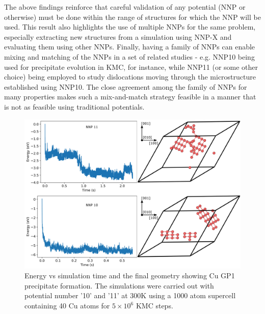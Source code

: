 \documentclass{article}
\begin{document}
The above findings reinforce that careful validation of any potential (NNP or otherwise) must be done within the range of structures for which the NNP will be used.  This result also highlights the use of multiple NNPs for the same problem, especially extracting new structures from a simulation using NNP-X and evaluating them using other NNPs.  Finally, having a family of NNPs can enable mixing and matching of the NNPs in a set of related studies - e.g. NNP10 being used for precipitate evolution in KMC, for instance, while NNP11 (or some other choice) being employed to study dislocations moving through the microstructure established using NNP10.  The close agreement among the family of NNPs for many properties makes such a mix-and-match strategy feasible in a manner that is not as feasible using traditional potentials.


\begin{figure}[H]
  \centering
  \includegraphics[width=6.5in]{kmcFigures/gp1.pdf}
  \caption{Energy vs simulation time and the final geometry showing Cu GP1 precipitate formation. The simulations were carried out with potential number '10' and '11' at 300K using a 1000 atom supercell containing 40 Cu atoms for $5\times10^6$ KMC steps.
  }
  \label{fig:gp1}
\end{figure}
%
\end{document}
